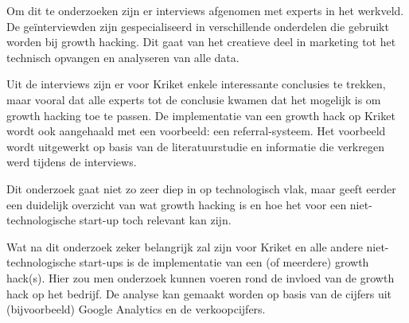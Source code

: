 Om dit te onderzoeken zijn er interviews afgenomen met experts in het werkveld. De geïnterviewden zijn gespecialiseerd in verschillende onderdelen die gebruikt worden bij growth hacking. Dit gaat van het creatieve deel in marketing tot het technisch opvangen en analyseren van alle data. 

Uit de interviews zijn er voor Kriket enkele interessante conclusies te trekken, maar vooral dat alle experts tot de conclusie kwamen dat het mogelijk is om growth hacking toe te passen. De implementatie van een growth hack op Kriket wordt ook aangehaald met een voorbeeld: een referral-systeem. Het voorbeeld wordt uitgewerkt op basis van de literatuurstudie en informatie die verkregen werd tijdens de interviews. 

Dit onderzoek gaat niet zo zeer diep in op technologisch vlak, maar geeft eerder een duidelijk overzicht van wat growth hacking is en hoe het voor een niet-technologische start-up toch relevant kan zijn. 

Wat na dit onderzoek zeker belangrijk zal zijn voor Kriket en alle andere niet-technologische start-ups is de implementatie van een (of meerdere) growth hack(s). Hier zou men onderzoek kunnen voeren rond de invloed van de growth hack op het bedrijf. De analyse kan gemaakt worden op basis van de cijfers uit (bijvoorbeeld) Google Analytics en de verkoopcijfers.